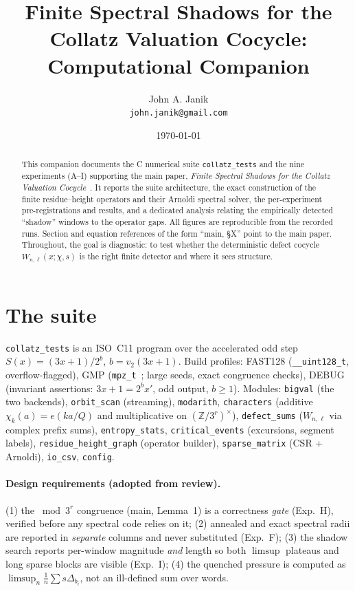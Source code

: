 \documentclass[11pt]{article}
\title{Finite Spectral Shadows for the Collatz Valuation Cocycle:\\
\large Computational Companion}
\author{John A. Janik\\\texttt{john.janik@gmail.com}}
\date{\today}
\newcommand{\Z}{\mathbb{Z}}
\theoremstyle{remark}
\begin{document}
\maketitle

\begin{abstract}
This companion documents the C numerical suite \texttt{collatz\_tests} and the
nine experiments (A--I) supporting the main paper, \emph{Finite Spectral Shadows
for the Collatz Valuation Cocycle}~\cite{main}. It reports the suite architecture, the exact
construction of the finite residue--height operators and their Arnoldi spectral
solver, the per-experiment pre-registrations and results, and a dedicated
analysis relating the empirically detected ``shadow'' windows to the operator
gaps. All figures are reproducible from the recorded runs. Section and equation
references of the form ``main, \S X'' point to the main paper. Throughout, the
goal is diagnostic: to test whether the deterministic defect cocycle
$W_{n,\ell}(x;\chi,s)$ is the right finite detector and where it sees structure.
\end{abstract}

\tableofcontents

\section{The suite}

\texttt{collatz\_tests} is an ISO~C11 program over the accelerated odd step
$S(x)=(3x+1)/2^{b}$, $b=v_2(3x+1)$. Build profiles:
\textsf{FAST128} (\texttt{\_\_uint128\_t}, overflow-flagged),
\textsf{GMP} (\texttt{mpz\_t}~\cite{gmp}; large seeds, exact congruence checks),
\textsf{DEBUG} (invariant assertions: $3x+1=2^bx'$, odd output, $b\ge1$).
Modules: \texttt{bigval} (the two backends), \texttt{orbit\_scan} (streaming),
\texttt{modarith}, \texttt{characters} (additive $\chi_k(a)=e(ka/Q)$ and
multiplicative on $(\Z/3^r)^\times$), \texttt{defect\_sums} ($W_{n,\ell}$ via
complex prefix sums), \texttt{entropy\_stats}, \texttt{critical\_events}
(excursions, segment labels), \texttt{residue\_height\_graph} (operator builder),
\texttt{sparse\_matrix} (CSR + Arnoldi), \texttt{io\_csv}, \texttt{config}.

\paragraph{Design requirements (adopted from review).}
(1) the $\bmod 3^r$ congruence (main, Lemma~1) is a correctness \emph{gate}
(Exp.~H), verified before any spectral code relies on it; (2) annealed and exact
spectral radii are reported in \emph{separate} columns and never substituted
(Exp.~F); (3) the shadow search reports per-window magnitude \emph{and} length so
both $\limsup$ plateaus and long sparse blocks are visible (Exp.~I); (4) the
quenched pressure is computed as $\limsup_n\frac1n\sum s\Delta_{b_i}$, not an
ill-defined sum over words.
\end{document}
